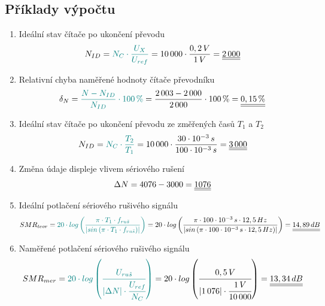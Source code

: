 \documentclass[a4paper, czech]{article}
\begin{document}
\subsection{Příklady výpočtu}

\begin{enumerate}
    \item Ideální stav čítače po ukončení převodu
    \begin{multline*}
        N_{ID} = \textcolor{teal}{N_C \cdot \frac{U_X}{U_{ref}}} = 10\,000 \cdot \frac{0,2\,V}{1\,V} = \underline{\underline{2\,000}} \hfill
    \end{multline*}
    \item Relativní chyba naměřené hodnoty čítače převodníku
    \begin{multline*}
        \delta_N = \textcolor{teal}{\frac{N - N_{ID}}{N_{ID}} \cdot 100\,\%} = \frac{2\,003 - 2\,000}{2\,000} \cdot 100\,\% = \underline{\underline{0,15\,\%}} \hfill
    \end{multline*}
    \item Ideální stav čítače po ukončení převodu ze změřených časů $T_1$ a $T_2$
    \begin{multline*}
        N_{ID} = \textcolor{teal}{N_C \cdot \frac{T_2}{T_1}} = 10\,000 \cdot \frac{30\cdot10^{-3}\,s}{100\cdot10^{-3}\,s} = \underline{\underline{3\,000}} \hfill
    \end{multline*}
    \item Změna údaje displeje vlivem sériového rušení
    \begin{multline*}
        \Delta N =  4076 - 3000 = \underline{\underline{1076}} \hfill
    \end{multline*}
    \item Ideální potlačení sériového rušivého signálu
    \begin{multline*}
        SMR_{teor} = \textcolor{teal}{20 \cdot log \left(\frac{\pi \cdot T_1 \cdot f_{ru \check{s}}}{\left|sin\left(\pi \cdot T_1 \cdot f_{ru \check{s}}\right)\right|}\right)} = 20 \cdot log \left(\frac{\pi \cdot 100\cdot10^{-3}\,s \cdot 12,5\,Hz}{\left|sin\left(\pi \cdot 100\cdot10^{-3}\,s \cdot 12,5\,Hz\right)\right|}\right) = \underline{\underline{14,89\,dB}} \hfill
    \end{multline*}
    \item Naměřené potlačení sériového rušivého signálu
    \begin{multline*}
        SMR_{mer} = \textcolor{teal}{20 \cdot log \left(\cfrac{U_{ru \check{s}}}{\left|\Delta N\right| \cdot \cfrac{U_{ref}}{N_C}}\right)} = 20 \cdot log \left(\cfrac{0,5\,V}{\left|1\,076\right| \cdot \cfrac{1\,V}{10\,000}}\right) = \underline{\underline{13,34\,dB}} \hfill
    \end{multline*}
\end{enumerate}
\end{document}
